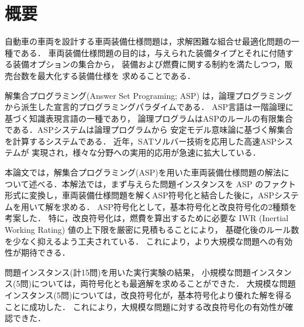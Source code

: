 \chapter*{概要}

自動車の車両を設計する車両装備仕様問題は，求解困難な組合せ最適化問題の一種である．
車両装備仕様問題の目的は，与えられた装備タイプとそれに付随する装備オプションの集合から，
装備および燃費に関する制約を満たしつつ，販売台数を最大化する装備仕様を
求めることである．

解集合プログラミング(Answer Set Programing; ASP)
は，論理プログラミングから派生した宣言的プログラミングパラダイムである．
ASP言語は一階論理に基づく知識表現言語の一種であり，
論理プログラムはASPのルールの有限集合である．ASPシステムは論理プログラムから
安定モデル意味論に基づく解集合を計算するシステムである．
近年，SATソルバー技術を応用した高速ASPシステムが
実現され，様々な分野への実用的応用が急速に拡大している．

本論文では，解集合プログラミング(ASP)を用いた車両装備仕様問題の解法に
ついて述べる．本解法では，まず与えらた問題インスタンスを ASP のファクト
形式に変換し，車両装備仕様問題を解くASP符号化と結合した後に，ASPシステ
ムを用いて解を求める．
ASP符号化として，基本符号化と改良符号化の2種類を考案した．
特に，改良符号化は，燃費を算出するために必要な
IWR (Inertial Working Rating) 値の上下限を厳密に見積もることにより，
基礎化後のルール数を少なく抑えるよう工夫されている．
これにより，より大規模な問題への有効性が期待できる．

問題インスタンス(計15問)を用いた実行実験の結果，
小規模な問題インスタンス(5問)については，両符号化とも最適解を求めることができた．
大規模な問題インスタンス(5問)については，改良符号化が，基本符号化より優れた解を得ることに成功した．
これにより，大規模な問題に対する改良符号化の有効性が確認できた．


